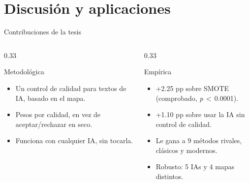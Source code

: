 
\section{Discusión y aplicaciones}

\iffalse
\begin{frame}{Contribuciones de la tesis}
\small
\begin{columns}[T]

\begin{column}{0.33\textwidth}
\begin{block}{Metodológica}
\scriptsize
\begin{itemize}\setlength\itemsep{0pt}
  \item Un control de calidad para textos de IA, basado en el mapa.
  \item Pesos por calidad, en vez de aceptar/rechazar en seco.
  \item Funciona con cualquier IA, sin tocarla.
\end{itemize}
\end{block}
\end{column}

\begin{column}{0.33\textwidth}
\begin{block}{Empírica}
\scriptsize
\begin{itemize}\setlength\itemsep{0pt}
  \item +2.25 pp sobre SMOTE\\(comprobado, \textit{p}\,$<$\,0.0001).
  \item +1.10 pp sobre usar la IA sin control de calidad.
  \item Le gana a 9 métodos rivales, clásicos y modernos.
  \item Robusto: 5 IAs y 4 mapas distintos.
\end{itemize}
\end{block}
\end{column}


\end{columns}
\end{frame}
